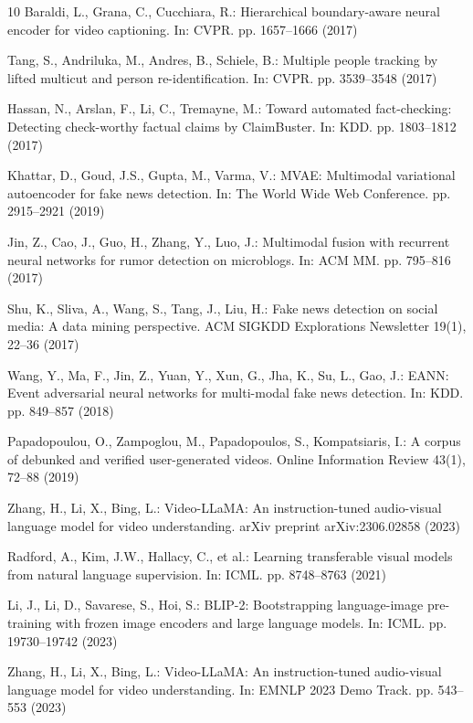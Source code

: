 \documentclass[runningheads]{llncs}
\begin{document}
\begin{thebibliography}{10}
Baraldi, L., Grana, C., Cucchiara, R.: Hierarchical boundary-aware neural encoder for video captioning. In: CVPR. pp. 1657--1666 (2017)

Tang, S., Andriluka, M., Andres, B., Schiele, B.: Multiple people tracking by lifted multicut and person re-identification. In: CVPR. pp. 3539--3548 (2017)

Hassan, N., Arslan, F., Li, C., Tremayne, M.: Toward automated fact-checking: Detecting check-worthy factual claims by ClaimBuster. In: KDD. pp. 1803--1812 (2017)

Khattar, D., Goud, J.S., Gupta, M., Varma, V.: MVAE: Multimodal variational autoencoder for fake news detection. In: The World Wide Web Conference. pp. 2915--2921 (2019)

Jin, Z., Cao, J., Guo, H., Zhang, Y., Luo, J.: Multimodal fusion with recurrent neural networks for rumor detection on microblogs. In: ACM MM. pp. 795--816 (2017)

Shu, K., Sliva, A., Wang, S., Tang, J., Liu, H.: Fake news detection on social media: A data mining perspective. ACM SIGKDD Explorations Newsletter 19(1), 22--36 (2017)

Wang, Y., Ma, F., Jin, Z., Yuan, Y., Xun, G., Jha, K., Su, L., Gao, J.: EANN: Event adversarial neural networks for multi-modal fake news detection. In: KDD. pp. 849--857 (2018)

Papadopoulou, O., Zampoglou, M., Papadopoulos, S., Kompatsiaris, I.: A corpus of debunked and verified user-generated videos. Online Information Review 43(1), 72--88 (2019)

Zhang, H., Li, X., Bing, L.: Video-LLaMA: An instruction-tuned audio-visual language model for video understanding. arXiv preprint arXiv:2306.02858 (2023)

Radford, A., Kim, J.W., Hallacy, C., et al.: Learning transferable visual models from natural language supervision. In: ICML. pp. 8748--8763 (2021)

Li, J., Li, D., Savarese, S., Hoi, S.: BLIP-2: Bootstrapping language-image pre-training with frozen image encoders and large language models. In: ICML. pp. 19730--19742 (2023)

Zhang, H., Li, X., Bing, L.: Video-LLaMA: An instruction-tuned audio-visual language model for video understanding. In: EMNLP 2023 Demo Track. pp. 543--553 (2023)


\end{thebibliography}
\end{document}
